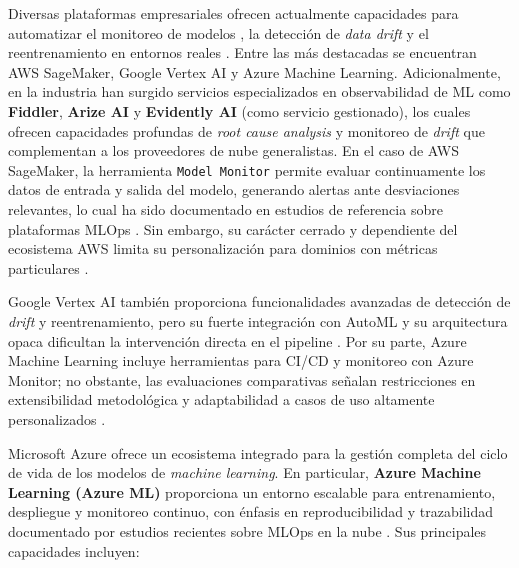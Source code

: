 Diversas plataformas empresariales ofrecen actualmente capacidades para automatizar el monitoreo de modelos \citep{Bhatt2025}, la detección de \textit{data drift} y el reentrenamiento en entornos reales \citep{Berberi2025,Lwakatare2020}. Entre las más destacadas se encuentran AWS SageMaker, Google Vertex AI y Azure Machine Learning. Adicionalmente, en la industria han surgido servicios especializados en observabilidad de ML como \textbf{Fiddler}, \textbf{Arize AI} y \textbf{Evidently AI} (como servicio gestionado), los cuales ofrecen capacidades profundas de \textit{root cause analysis} y monitoreo de \textit{drift} que complementan a los proveedores de nube generalistas. En el caso de AWS SageMaker, la herramienta \texttt{Model Monitor} permite evaluar continuamente los datos de entrada y salida del modelo, generando alertas ante desviaciones relevantes, lo cual ha sido documentado en estudios de referencia sobre plataformas MLOps \citep{Berberi2025}. Sin embargo, su carácter cerrado y dependiente del ecosistema AWS limita su personalización para dominios con métricas particulares \citep{Bhatt2025}.

Google Vertex AI también proporciona funcionalidades avanzadas de detección de \textit{drift} y reentrenamiento, pero su fuerte integración con AutoML y su arquitectura opaca dificultan la intervención directa en el pipeline \citep{Berberi2025}. Por su parte, Azure Machine Learning incluye herramientas para CI/CD y monitoreo con Azure Monitor; no obstante, las evaluaciones comparativas señalan restricciones en extensibilidad metodológica y adaptabilidad a casos de uso altamente personalizados \citep{Bhatt2025,Lopez2022}.


Microsoft Azure ofrece un ecosistema integrado para la gestión completa del ciclo de vida de los modelos de \textit{machine learning}. En particular, \textbf{Azure Machine Learning (Azure ML)} proporciona un entorno escalable para entrenamiento, despliegue y monitoreo continuo, con énfasis en reproducibilidad y trazabilidad documentado por estudios recientes sobre MLOps en la nube \citep{Berberi2025,Bhatt2025}. Sus principales capacidades incluyen:

